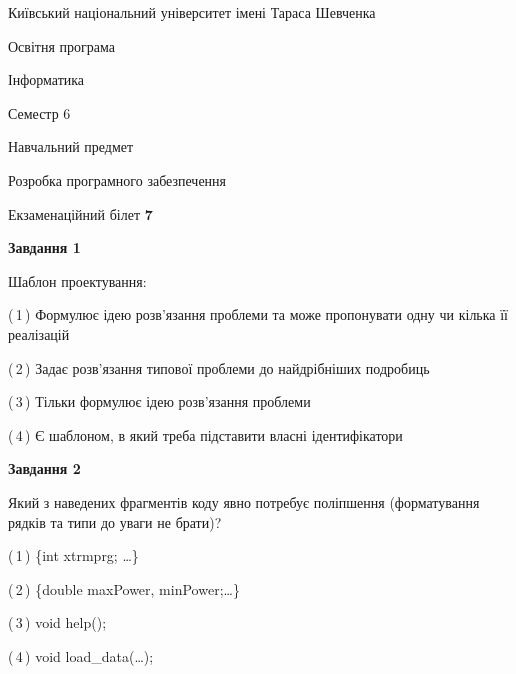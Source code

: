 \documentclass[10pt, ukrainian]{article}
\begin{document}
{{\begin {small}\par
{ \center  Київський національний університет імені Тараса Шевченка \par}
{\parbox {5 cm}{Освітня програма \hfill}{\parbox {7 cm}{Інформатика \hfill}}\parbox {6 cm}{\hfill Семестр 6}}\par
{\parbox {5 cm} {Навчальний предмет \hfill}\parbox {7 cm}{Розробка програмного забезпечення \hfill}\parbox {6cm}{\hfill}\par}\vspace{-7pt} \end{small}}{\center Екзаменаційний білет \No \textbf
{ 7 }\par}}
{
\begin {large}
{\begin {center}\textbf{Завдання 1}\end {center}}\par
Шаблон проектування:\par
\vspace{2mm}



(\,1\,) Формулює ідею розв'язання проблеми та може пропонувати одну чи кілька її реалізацій%



(\,2\,) Задає розв'язання типової проблеми до найдрібніших подробиць%



(\,3\,) Тільки формулює ідею розв'язання проблеми%



(\,4\,) Є шаблоном, в який треба підставити власні ідентифікатори%


{\begin {center}\textbf{Завдання 2}\end {center}}\par
Який з наведених фрагментів коду явно потребує поліпшення (форматування рядків та типи до уваги не брати)?\par
\vspace{2mm}



(\,1\,) \{int xtrmprg; …\}%



(\,2\,) \{double maxPower, minPower;…\} %



(\,3\,) void help();%



(\,4\,) void load\_data(…);%



\end{large}}
\end{document}
